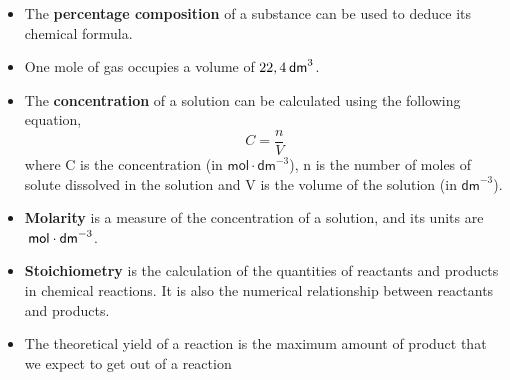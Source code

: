 \begin{itemize}[noitemsep]
\label{m38712*uid116}\item The \textbf{percentage composition} of a substance can be used to deduce its chemical formula.
\label{m38712*uid117}\item One mole of gas occupies a volume of $22,4\phantom{\rule{2pt}{0ex}}{\mathsf{dm}}^{3}$.
\label{m38712*uid118}\item The \textbf{concentration} of a solution can be calculated using the following equation,
\label{m38712*id286019}\nopagebreak\noindent{}
    \begin{equation}
    C=\frac{n}{V}
      \end{equation}
where C is the concentration (in $\mathsf{mol}\ensuremath{\cdot}{\mathsf{dm}}^{-3}$), n is the number of moles of solute dissolved in the solution and V is the volume of the solution (in ${\mathsf{dm}}^{-3}$).
\label{m38712*uid119}\item \textbf{Molarity} is a measure of the concentration of a solution, and its units are $\phantom{\rule{2pt}{0ex}}\mathsf{mol}\ensuremath{\cdot}{\mathsf{dm}}^{-3}$.
\label{m38712*uid120}\item \textbf{Stoichiometry} is the calculation of the quantities of reactants and products in chemical reactions. It is also the numerical relationship between reactants and products.
\item The theoretical yield of a reaction is the maximum amount of product that we expect to get out of a reaction\end{itemize}
\label{m38712*secfhsst!!!underscore!!!id2334}
